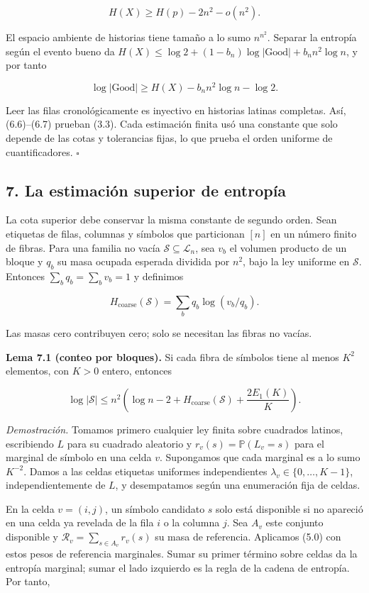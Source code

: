 \documentclass[spanish,11pt,a4paper]{article}
\begin{document}
\nopagebreak[4]
\[H(X)\ge H(p)-2n^2-o(n^2).\tag{6.6}\]

El espacio ambiente de historias tiene tamaño a lo sumo \(n^{n^2}\). Separar la entropía según el evento bueno da \(H(X)\le\log2+(1-b_n)\log|\mathrm{Good}|+b_n n^2\log n\), y por tanto

\nopagebreak[4]
\[\log|\mathrm{Good}|\ge H(X)-b_n n^2\log n-\log2.\tag{6.7}\]

Leer las filas cronológicamente es inyectivo en historias latinas completas. Así, (6.6)--(6.7) prueban (3.3). Cada estimación finita usó una constante que solo depende de las cotas y tolerancias fijas, lo que prueba el orden uniforme de cuantificadores. \(\square\)

\subsection{7. La estimación superior de entropía}\label{la-estimaciuxf3n-superior-de-entropuxeda}

La cota superior debe conservar la misma constante de segundo orden. Sean etiquetas de filas, columnas y símbolos que particionan \([n]\) en un número finito de fibras. Para una familia no vacía \(\mathcal S\subseteq\mathcal L_n\), sea \(v_b\) el volumen producto de un bloque y \(q_b\) su masa ocupada esperada dividida por \(n^2\), bajo la ley uniforme en \(\mathcal S\). Entonces \(\sum_bq_b=\sum_bv_b=1\) y definimos

\nopagebreak[4]
\[H_{\mathrm{coarse}}(\mathcal S)=\sum_bq_b\log(v_b/q_b).\tag{7.1}\]

Las masas cero contribuyen cero; solo se necesitan las fibras no vacías.

\textbf{Lema 7.1 (conteo por bloques).} Si cada fibra de símbolos tiene al menos \(K^2\) elementos, con \(K>0\) entero, entonces

\nopagebreak[4]
\[\log|\mathcal S|\le n^2\left(\log n-2+H_{\mathrm{coarse}}(\mathcal S)
+\frac{2E_1(K)}K\right).\tag{7.2}\]

\emph{Demostración.} Tomamos primero cualquier ley finita sobre cuadrados latinos, escribiendo \(L\) para su cuadrado aleatorio y \(r_v(s)=\mathbb P(L_v=s)\) para el marginal de símbolo en una celda \(v\). Supongamos que cada marginal es a lo sumo \(K^{-2}\). Damos a las celdas etiquetas uniformes independientes \(\lambda_v\in\{0,\ldots,K-1\}\), independientemente de \(L\), y desempatamos según una enumeración fija de celdas.

En la celda \(v=(i,j)\), un símbolo candidato \(s\) solo está disponible si no apareció en una celda ya revelada de la fila \(i\) o la columna \(j\). Sea \(A_v\) este conjunto disponible y \(\mathcal R_v=\sum_{s\in A_v}r_v(s)\) su masa de referencia. Aplicamos (5.0) con estos pesos de referencia marginales. Sumar su primer término sobre celdas da la entropía marginal; sumar el lado izquierdo es la regla de la cadena de entropía. Por tanto,
\end{document}
